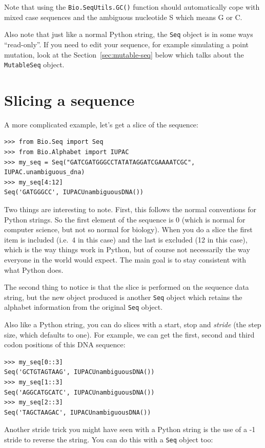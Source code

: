 \documentclass{report}
\begin{document}
\noindent Note that using the \verb|Bio.SeqUtils.GC()| function should automatically cope with mixed case sequences and the ambiguous nucleotide S which means G or C.

Also note that just like a normal Python string, the \verb|Seq| object is in some ways ``read-only''.  If you need to edit your sequence, for example simulating a point mutation, look at the Section~\ref{sec:mutable-seq} below which talks about the \verb|MutableSeq| object.

\section{Slicing a sequence}

A more complicated example, let's get a slice of the sequence:

\begin{verbatim}
>>> from Bio.Seq import Seq
>>> from Bio.Alphabet import IUPAC
>>> my_seq = Seq("GATCGATGGGCCTATATAGGATCGAAAATCGC", IUPAC.unambiguous_dna)
>>> my_seq[4:12]
Seq('GATGGGCC', IUPACUnambiguousDNA())
\end{verbatim}

Two things are interesting to note. First, this follows the normal conventions for Python strings.  So the first element of the sequence is 0 (which is normal for computer science, but not so normal for biology). When you do a slice the first item is included (i.e.~4 in this case) and the last is excluded (12 in this case), which is the way things work in Python, but of course not necessarily the way everyone in the world would expect. The main goal is to stay consistent with what Python does.

The second thing to notice is that the slice is performed on the sequence data string, but the new object produced is another \verb|Seq| object which retains the alphabet information from the original \verb|Seq| object.

Also like a Python string, you can do slices with a start, stop and \emph{stride} (the step size, which defaults to one).  For example, we can get the first, second and third codon positions of this DNA sequence:

\begin{verbatim}
>>> my_seq[0::3]
Seq('GCTGTAGTAAG', IUPACUnambiguousDNA())
>>> my_seq[1::3]
Seq('AGGCATGCATC', IUPACUnambiguousDNA())
>>> my_seq[2::3]
Seq('TAGCTAAGAC', IUPACUnambiguousDNA())
\end{verbatim}

Another stride trick you might have seen with a Python string is the use of a -1 stride to reverse the string.  You can do this with a \verb|Seq| object too:
\end{document}
